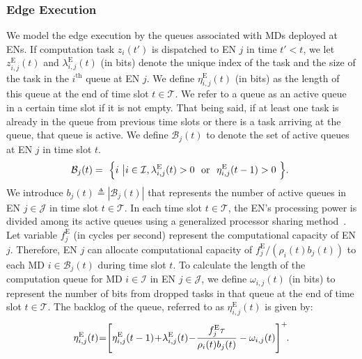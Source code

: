 \documentclass[10pt, journal,letterpaper]{IEEEtran}
\begin{document}
\subsubsection{Edge Execution}
We model the edge execution by the queues associated with MDs deployed at ENs. If computation task $z_i(t')$ is dispatched to EN $j$ in time $t' < t$, we let $z_{i,j}^{\text{E}}(t)$ and $\lambda_{i,j}^{\text{E}}(t)$ (in bits) denote the unique index of the task and the size of the task in the $i^{\text{th}}$ queue at EN $j$. We define $\eta_{i,j}^{\text{E}}(t)$ (in bits) as the length of this queue at the end of time slot $t \in \mathcal{T}$. We refer to a queue as an active queue in a certain time slot if it is not empty. That being said, if at least one task is already in the queue from previous time slots or there is a task arriving at the queue, that queue is active. We define $\mathcal{B}_j(t)$ to denote the set of active queues at EN $j$ in time slot $t$.
\begin{alignat}{1}
	\mathcal{B}_j(t) = \textcolor{white}{i}\Big\{i \textcolor{white}{i}\big| i \in \mathcal{I}, \lambda_{i,j}^{\text{E}}(t)>0\,\, \textcolor{white}{i}\text{or}\textcolor{white}{i} \,\, \eta_{i,j}^{\text{E}}(t-1)>0\textcolor{white}{i}\Big\}.\textcolor{white}{i}
	\label{9}  
\end{alignat}
We introduce $b_j(t) \triangleq |\mathcal{B}_j(t)|$ that represents the number of active queues in EN $j \in \mathcal{J}$ in time slot $t \in \mathcal{T}$. In each time slot $t \in \mathcal{T}$, the EN's processing power is divided among its active queues using a generalized processor sharing method~\cite{parekh1993generalized}. Let variable $f_j^{\text{E}}$ (in cycles per second) represent the computational capacity of EN $j$. Therefore, EN $j$ can allocate computational capacity of $f_j^{\text{E}}/(\rho_i(t) b_j(t))$ to each MD $i \in \mathcal{B}_j(t)$ during time slot $t$. To calculate the length of the computation queue for MD $i \in \mathcal{I}$ in EN $j \in \mathcal{J}$, we define $\omega_{i,j}(t)$ (in bits) to represent the number of bits from dropped tasks in that queue at the end of time slot $t \in \mathcal{T}$. The backlog of the queue, referred to as $\eta_{i,j}^{\text{E}}(t)$ is given by:
\begin{alignat}{1}
	\eta_{i,j}^{\text{E}}(t)\hspace{-0.8mm}=\hspace{-1mm}\left[\eta_{i,j}^{\text{E}}(t-1)\hspace{-0.6mm}+\hspace{-0.7mm}\lambda_{i,j}^{\text{E}}(t)\hspace{-0.7mm}-\hspace{-0.7mm}{f_j^{\text{E}}\tau\over \rho_i(t)b_j(t)} -\omega_{i,j}(t)\right]^+\hspace{-1mm}.
	\label{10}  
\end{alignat}
\end{document}
